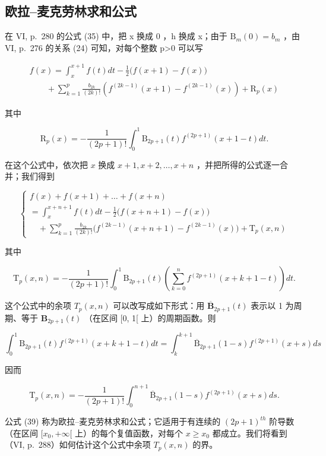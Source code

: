 \subsection{欧拉–麦克劳林求和公式}

在 VI, p.~280 的公式 (35) 中，把 x 换成 0 ，h 换成 x；由于 \(\mathrm{B}_{m}(0)=b_{m}\) ，由 VI, p.~276 的关系 (24) 可知，对每个整数 p\textgreater0 可以写

\[
\begin{array}{l} f (x) = \int_ {x} ^ {x + 1} f (t) d t - \frac {1}{2} \big (f (x + 1) - f (x) \big) \\ \qquad + \sum_ {k = 1} ^ {p} \frac {b _ {2 k}}{(2 k) !} \left(f ^ {(2 k - 1)} (x + 1) - f ^ {(2 k - 1)} (x)\right) + \mathrm{R} _ {p} (x) \end{array}\tag{37}
\]

其中

\[
\mathrm{R} _ {p} (x) = - \frac {1}{(2 p + 1) !} \int_ {0} ^ {1} \mathrm{B} _ {2 p + 1} (t) f ^ {(2 p + 1)} (x + 1 - t) d t.\tag{38}
\]

在这个公式中，依次把 \(x\) 换成 \(x + 1, x + 2, \ldots, x + n\) ，并把所得的公式逐一合并；我们得到

\[
\left\{ \begin{array}{l} f (x) + f (x + 1) + \dots + f (x + n) \\ = \int_ {x} ^ {x + n + 1} f (t) d t - \frac {1}{2} \bigl (f (x + n + 1) - f (x) \bigr) \\ \quad + \sum_ {k = 1} ^ {p} \frac {b _ {2 k}}{(2 k) !} \bigl (f ^ {(2 k - 1)} (x + n + 1) - f ^ {(2 k - 1)} (x) \bigr) + \mathrm{T} _ {p} (x, n) \end{array} \right.\tag{39}
\]

其中

\[
\mathrm{T} _ {p} (x, n) = - \frac {1}{(2 p + 1) !} \int_ {0} ^ {1} \mathrm{B} _ {2 p + 1} (t) \left(\sum_ {k = 0} ^ {n} f ^ {(2 p + 1)} (x + k + 1 - t)\right) d t.\tag{40}
\]

这个公式中的余项 \(T_{p}(x,n)\) 可以改写成如下形式：用 \(\overline{\mathbf{B}}_{2p+1}(t)\) 表示以 1 为周期、等于 \(\mathbf{B}_{2p+1}(t)\) （在区间 {[}0, 1{[} 上）的周期函数。则

\[
\int_ {0} ^ {1} \mathrm{B} _ {2 p + 1} (t) f ^ {(2 p + 1)} (x + k + 1 - t) d t = \int_ {k} ^ {k + 1} \overline {{\mathrm{B}}} _ {2 p + 1} (1 - s) f ^ {(2 p + 1)} (x + s) d s
\]

因而

\[
\mathrm{T} _ {p} (x, n) = - \frac {1}{(2 p + 1) !} \int_ {0} ^ {n + 1} \overline {{\mathrm{B}}} _ {2 p + 1} (1 - s) f ^ {(2 p + 1)} (x + s) d s.\tag{41}
\]

公式 (39) 称为欧拉–麦克劳林求和公式；它适用于有连续的 \((2p+1)^{th}\) 阶导数（在区间 \([x_{0},+\infty[\) 上）的每个复值函数，对每个 \(x\geqslant x_{0}\) 都成立。我们将看到（VI, p.~288）如何估计这个公式中余项 \(T_{p}(x,n)\) 的界。

